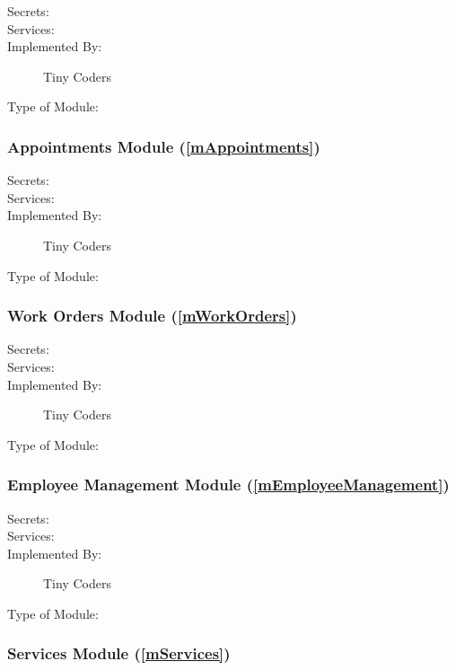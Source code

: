 \documentclass[12pt, titlepage]{article}
\begin{document}
\begin{description}
	\item[Secrets:]
	\item[Services:]
	\item[Implemented By:] Tiny Coders
	\item[Type of Module:]
\end{description}

\subsubsection{Appointments Module (\ref{mAppointments})}

\begin{description}
	\item[Secrets:]
	\item[Services:]
	\item[Implemented By:] Tiny Coders
	\item[Type of Module:]
\end{description}

\subsubsection{Work Orders Module (\ref{mWorkOrders})}

\begin{description}
	\item[Secrets:]
	\item[Services:]
	\item[Implemented By:] Tiny Coders
	\item[Type of Module:]
\end{description}

\subsubsection{Employee Management Module (\ref{mEmployeeManagement})}

\begin{description}
	\item[Secrets:]
	\item[Services:]
	\item[Implemented By:] Tiny Coders
	\item[Type of Module:]
\end{description}

\subsubsection{Services Module (\ref{mServices})}
\end{document}
